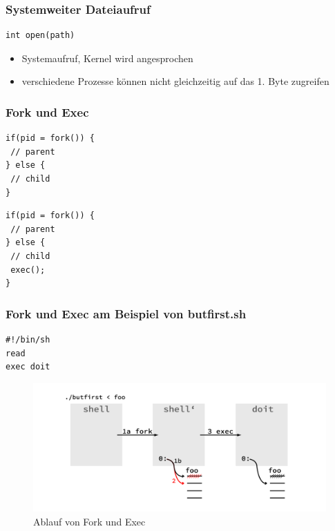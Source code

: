 
	\subsubsection*{Systemweiter Dateiaufruf} %
	\label{ssub:systemweiter_dateiaufruf}

		\lstCcode[Systemaufruf]
		\begin{lstlisting}
int open(path)
		\end{lstlisting}

		\begin{itemize}
			\item Systemaufruf, Kernel wird angesprochen
			\item verschiedene Prozesse können nicht gleichzeitig auf das 1. Byte zugreifen
		\end{itemize}
	

	\subsubsection*{Fork und Exec} %
	\label{ssub:aufruf_von_fork}
	
		\begin{lstlisting}
if(pid = fork()) {
 // parent
} else {
 // child
}
		\end{lstlisting}

		\begin{lstlisting}
if(pid = fork()) {
 // parent
} else {
 // child
 exec();
}
		\end{lstlisting}


	\subsubsection*{Fork und Exec am Beispiel von butfirst.sh} %
	\label{ssub:fork_am_beispiel_von_butfirst_sh}
	
		\lstShell
		\begin{lstlisting}
#!/bin/sh
read
exec doit
		\end{lstlisting}

		\begin{figure}[th]
			\caption{Ablauf von Fork und Exec}
			\includegraphics[width=\textwidth]{workfiles/v2_4}
		\end{figure}

